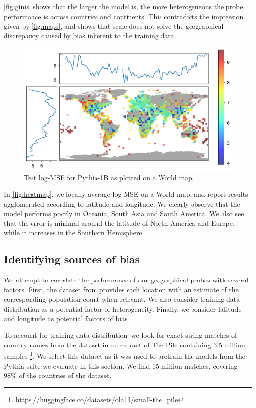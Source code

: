 \autoref{fig:ginis} shows that the larger the model is, the more heterogeneous the probe performance is across countries and continents. This contradicts the impression given by \autoref{fig:maps}, and shows that scale does not solve the geographical discrepancy caused by bias inherent to the training data.

\begin{figure}[h]
    \centering
    \includegraphics[width=0.6\linewidth]{sources/part_1/geographical/imgs/heatmap_100_50.png}
    \caption{Test log-MSE for Pythia-1B as plotted on a World map.}
    \label{fig:heatmap}
\end{figure}

In \autoref{fig:heatmap}, we locally average log-MSE on a World map, and report results agglomerated according to latitude and longitude. We clearly observe that the model performs poorly in Oceania, South Asia and South America. We also see that the error is minimal around the latitude of North America and Europe, while it increases in the Southern Hemisphere.

\subsection{Identifying sources of bias}
We attempt to correlate the performance of our geographical probes with several factors. First, the dataset from \citep{gurnee2023language} provides each location with an estimate of the corresponding population count when relevant. We also consider training data distribution as a potential factor of heterogeneity. Finally, we consider latitude and longitude as potential factors of bias.


To account for training data distribution, we look for exact string matches of country names from the \citet{gurnee2023language} dataset in an extract of The Pile \citep{gao2020pile} containing 3.5 million samples \footnote{\url{https://huggingface.co/datasets/ola13/small-the\_pile}}. We select this dataset as it was used to pretrain the models from the Pythia suite \citep{pythia} we evaluate in this section. We find 15 million matches, covering 98\% of the countries of the dataset.

